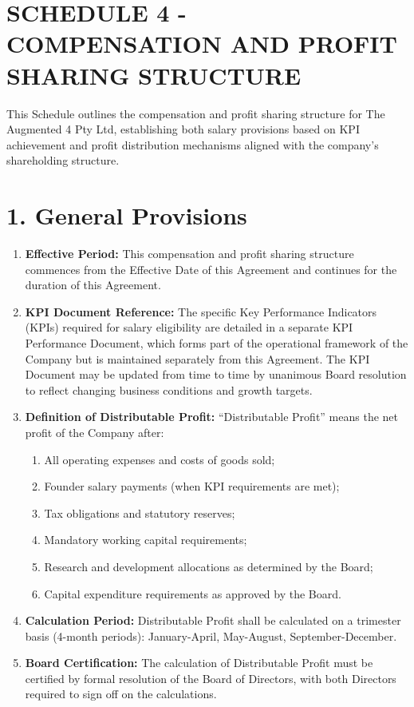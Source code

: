 \section*{SCHEDULE 4 - COMPENSATION AND PROFIT SHARING STRUCTURE}

This Schedule outlines the compensation and profit sharing structure for The Augmented 4 Pty Ltd, establishing both salary provisions based on KPI achievement and profit distribution mechanisms aligned with the company's shareholding structure.

\section*{1. General Provisions}
\begin{enumerate}[label=\arabic*.]
\item \textbf{Effective Period:} This compensation and profit sharing structure commences from the Effective Date of this Agreement and continues for the duration of this Agreement.

\item \textbf{KPI Document Reference:} The specific Key Performance Indicators (KPIs) required for salary eligibility are detailed in a separate KPI Performance Document, which forms part of the operational framework of the Company but is maintained separately from this Agreement. The KPI Document may be updated from time to time by unanimous Board resolution to reflect changing business conditions and growth targets.

\item \textbf{Definition of Distributable Profit:} ``Distributable Profit'' means the net profit of the Company after:
    \begin{enumerate}[label=(\alph*)]
    \item All operating expenses and costs of goods sold;
    \item Founder salary payments (when KPI requirements are met);
    \item Tax obligations and statutory reserves;
    \item Mandatory working capital requirements;
    \item Research and development allocations as determined by the Board;
    \item Capital expenditure requirements as approved by the Board.
    \end{enumerate}

\item \textbf{Calculation Period:} Distributable Profit shall be calculated on a trimester basis (4-month periods): January-April, May-August, September-December.

\item \textbf{Board Certification:} The calculation of Distributable Profit must be certified by formal resolution of the Board of Directors, with both Directors required to sign off on the calculations.
\end{enumerate}

